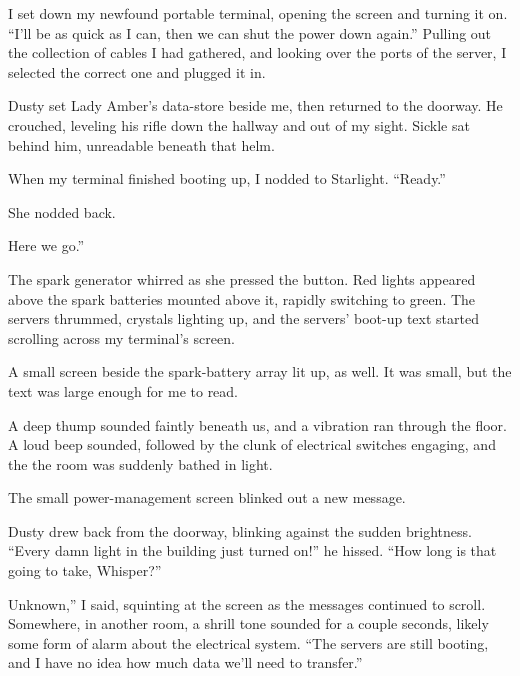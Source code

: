 I set down my newfound portable terminal, opening the screen and turning it on. “I’ll be as quick as I can, then we can shut the power down again.” Pulling out the collection of cables I had gathered, and looking over the ports of the server, I selected the correct one and plugged it in.

Dusty set Lady Amber’s data-store beside me, then returned to the doorway. He crouched, leveling his rifle down the hallway and out of my sight. Sickle sat behind him, unreadable beneath that helm.

When my terminal finished booting up, I nodded to Starlight. “Ready.”

She nodded back.

\leavevmode{}Here we go.”

The spark generator whirred as she pressed the button. Red lights appeared above the spark batteries mounted above it, rapidly switching to green. The servers thrummed, crystals lighting up, and the servers’ boot-up text started scrolling across my terminal’s screen.

A small screen beside the spark-battery array lit up, as well. It was small, but the text was large enough for me to read.


A deep thump sounded faintly beneath us, and a vibration ran through the floor. A loud beep sounded, followed by the clunk of electrical switches engaging, and the the room was suddenly bathed in light.

The small power-management screen blinked out a new message.


Dusty drew back from the doorway, blinking against the sudden brightness. “Every damn light in the building just turned on!” he hissed. “How long is that going to take, Whisper?”

\leavevmode{}Unknown,” I said, squinting at the screen as the messages continued to scroll. Somewhere, in another room, a shrill tone sounded for a couple seconds, likely some form of alarm about the electrical system. “The servers are still booting, and I have no idea how much data we’ll need to transfer.”

